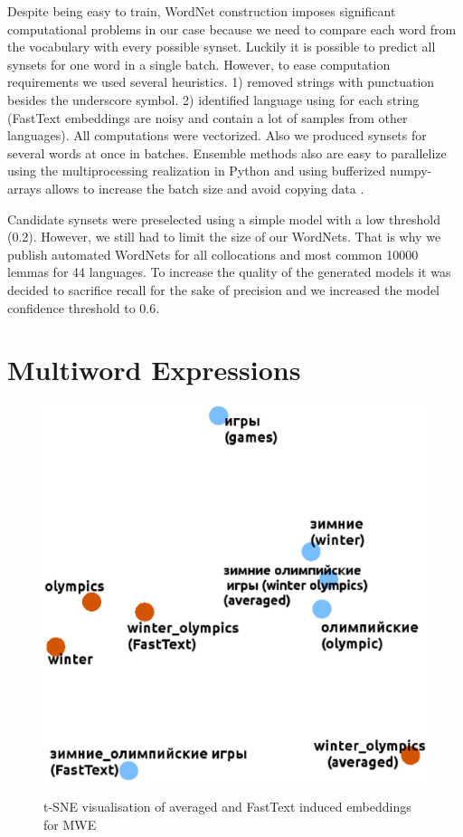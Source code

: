 \documentclass[11pt,a4paper]{article}
\begin{document}
Despite being easy to train, WordNet construction imposes significant computational problems in our case because we need to compare each word from the vocabulary with every possible synset. Luckily it is possible to predict all synsets for one word in a single batch. However, to ease computation requirements we used several heuristics. 1) removed strings with punctuation besides the underscore symbol. 2) identified language using \cite{Joulin2016} for each string (FastText embeddings are noisy and contain a lot of samples from other languages).  All computations were vectorized. Also we produced synsets for several words at once in batches. Ensemble methods also are easy to parallelize using the multiprocessing realization in Python and using bufferized numpy-arrays allows to increase the batch size and avoid copying data \cite{gorelick2014high}.

Candidate synsets were preselected using a simple model with a low threshold (0.2). However, we still had to limit the size of our WordNets. That is why we publish automated WordNets for all collocations and most common 10000 lemmas for 44 languages. To increase the quality of the generated models it was decided to sacrifice recall for the sake of precision and we increased the model confidence threshold to 0.6.

\section{Multiword Expressions}
\begin{figure}
	
	\centering
	\small
	\includegraphics[scale=0.3]{mwe}\\
	
	\caption{t-SNE visualisation of averaged and FastText induced embeddings for MWE}
	\label{mwe}
\end{figure}
\end{document}
